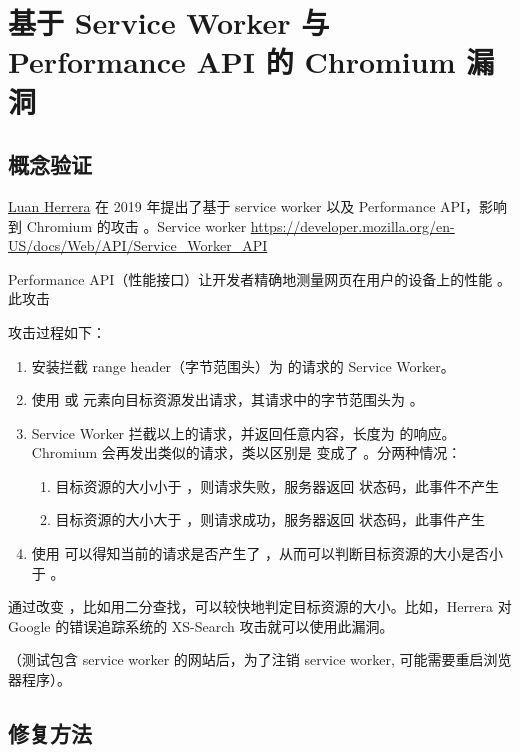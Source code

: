 \section{基于 Service Worker 与 Performance API 的 Chromium 漏洞}

\subsection{概念验证}

\href{https://blog.lbherrera.me/}{Luan Herrera} 在 2019 年提出了基于 service worker 以及 Performance API，影响到 Chromium 的攻击 \cite{herrera}。Service worker \url{https://developer.mozilla.org/en-US/docs/Web/API/Service_Worker_API} 

Performance API（性能接口）让开发者精确地测量网页在用户的设备上的性能 \cite{papi}。此攻击

攻击过程如下：

\begin{enumerate}
    \item 安装拦截 range header（字节范围头）为  的请求的 Service Worker。
    \item 使用  或  元素向目标资源发出请求，其请求中的字节范围头为 。
    \item Service Worker 拦截以上的请求，并返回任意内容，长度为  的响应。Chromium 会再发出类似的请求，类以区别是  变成了 。分两种情况：
    \begin{enumerate}
        \item 目标资源的大小小于 ，则请求失败，服务器返回  状态码，此事件不产生 
        \item 目标资源的大小大于 ，则请求成功，服务器返回  状态码，此事件产生 
    \end{enumerate}
    \item 使用  可以得知当前的请求是否产生了 ，从而可以判断目标资源的大小是否小于 。
\end{enumerate}

通过改变 ，比如用二分查找，可以较快地判定目标资源的大小。比如，Herrera 对 Google 的错误追踪系统的 XS-Search 攻击就可以使用此漏洞。

（测试包含 service worker 的网站后，为了注销 service worker, 可能需要重启浏览器程序）。

\subsection{修复方法}

